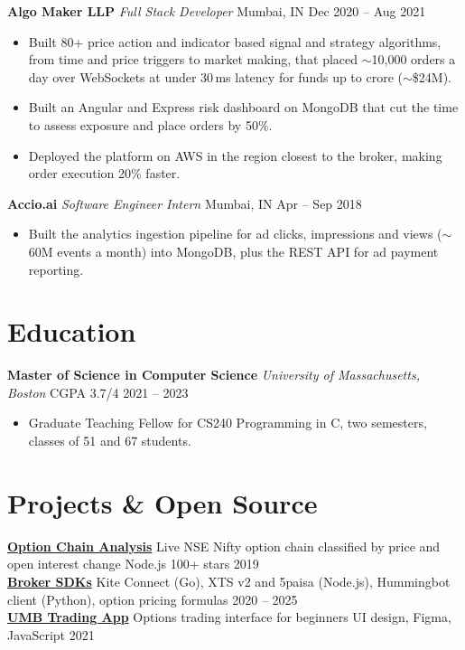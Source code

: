 \documentclass[10pt,a4paper]{article}
\newcommand{\job}[3]{\textbf{#1} \; \textit{#2} \hfill #3}
\begin{document}
\job{Algo Maker LLP}{Full Stack Developer}{Mumbai, IN \textperiodcentered{} Dec 2020 -- Aug 2021}
\begin{itemize}
  \item Built 80+ price action and indicator based signal and strategy algorithms, from time and price triggers to market making, that placed $\sim$10,000 orders a day over WebSockets at under 30\,ms latency for funds up to  crore ($\sim$\$24M).
  \item Built an Angular and Express risk dashboard on MongoDB that cut the time to assess exposure and place orders by 50\%.
  \item Deployed the platform on AWS in the region closest to the broker, making order execution 20\% faster.
\end{itemize}

\job{Accio.ai}{Software Engineer Intern}{Mumbai, IN \textperiodcentered{} Apr -- Sep 2018}
\begin{itemize}
  \item Built the analytics ingestion pipeline for ad clicks, impressions and views ($\sim$60M events a month) into MongoDB, plus the REST API for ad payment reporting.
\end{itemize}

\section{Education}
\textbf{Master of Science in Computer Science} \; \textit{University of Massachusetts, Boston} \hfill CGPA 3.7/4 \textperiodcentered{} 2021 -- 2023
\begin{itemize}
  \item Graduate Teaching Fellow for CS240 Programming in C, two semesters, classes of 51 and 67 students.
\end{itemize}

\section{Projects \& Open Source}
\textbf{\href{https://github.com/aadityatamrakar/option_chain_analysis}{Option Chain Analysis}} \textperiodcentered{} Live NSE Nifty option chain classified by price and open interest change \textperiodcentered{} Node.js \hfill 100+ stars \textperiodcentered{} 2019\\
\textbf{\href{https://github.com/aadityatamrakar}{Broker SDKs}} \textperiodcentered{} Kite Connect (Go), XTS v2 and 5paisa (Node.js), Hummingbot client (Python), option pricing formulas \hfill 2020 -- 2025\\
\textbf{\href{https://github.com/aadityatamrakar/umbtrading}{UMB Trading App}} \textperiodcentered{} Options trading interface for beginners \textperiodcentered{} UI design, Figma, JavaScript \hfill 2021
\end{document}
